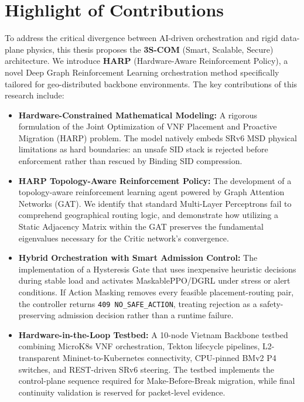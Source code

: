 \documentclass[12pt, a4paper, reqno, oneside]{book}
\begin{document}
\section{Highlight of Contributions}
To address the critical divergence between AI-driven orchestration and rigid data-plane physics, this thesis proposes the \textbf{3S-COM} (Smart, Scalable, Secure) architecture. We introduce \textbf{HARP} (Hardware-Aware Reinforcement Policy), a novel Deep Graph Reinforcement Learning orchestration method specifically tailored for geo-distributed backbone environments. The key contributions of this research include:

\begin{itemize}
    \item \textbf{Hardware-Constrained Mathematical Modeling:} A rigorous formulation of the Joint Optimization of VNF Placement and Proactive Migration (HARP) problem. The model natively embeds SRv6 MSD physical limitations as hard boundaries: an unsafe SID stack is rejected before enforcement rather than rescued by Binding SID compression.
    \item \textbf{HARP Topology-Aware Reinforcement Policy:} The development of a topology-aware reinforcement learning agent powered by Graph Attention Networks (GAT). We identify that standard Multi-Layer Perceptrons fail to comprehend geographical routing logic, and demonstrate how utilizing a Static Adjacency Matrix within the GAT preserves the fundamental eigenvalues necessary for the Critic network's convergence.
    \item \textbf{Hybrid Orchestration with Smart Admission Control:} The implementation of a Hysteresis Gate that uses inexpensive heuristic decisions during stable load and activates MaskablePPO/DGRL under stress or alert conditions. If Action Masking removes every feasible placement-routing pair, the controller returns \texttt{409 NO\_SAFE\_ACTION}, treating rejection as a safety-preserving admission decision rather than a runtime failure.
    \item \textbf{Hardware-in-the-Loop Testbed:} A 10-node Vietnam Backbone testbed combining MicroK8s VNF orchestration, Tekton lifecycle pipelines, L2-transparent Mininet-to-Kubernetes connectivity, CPU-pinned BMv2 P4 switches, and REST-driven SRv6 steering. The testbed implements the control-plane sequence required for Make-Before-Break migration, while final continuity validation is reserved for packet-level evidence.
\end{itemize}
\end{document}
